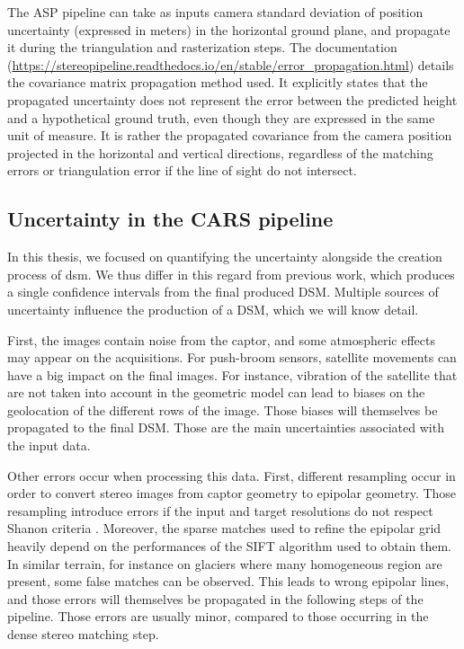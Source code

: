The ASP pipeline can take as inputs camera standard deviation of position uncertainty (expressed in meters) in the horizontal ground plane, and propagate it during the triangulation and rasterization steps. The documentation (\url{https://stereopipeline.readthedocs.io/en/stable/error_propagation.html}) details the covariance matrix propagation method used. It explicitly states that the propagated uncertainty does not represent the error between the predicted height and a hypothetical ground truth, even though they are expressed in the same unit of measure. It is rather the propagated covariance from the camera position projected in the horizontal and vertical directions, regardless of the matching errors or triangulation error if the line of sight do not intersect.

\subsection{Uncertainty in the CARS pipeline}
In this thesis, we focused on quantifying the uncertainty alongside the creation process of \acrshort{dsm}. We thus differ in this regard from previous work, which produces a single confidence intervals from the final produced DSM. Multiple sources of uncertainty influence the production of a DSM, which we will know detail.

First, the images contain noise from the captor, and some atmospheric effects may appear on the acquisitions. For push-broom sensors, satellite movements can have a big impact on the final images. For instance, vibration of the satellite that are not taken into account in the geometric model can lead to biases on the geolocation of the different rows of the image. Those biases will themselves be propagated to the final DSM. Those are the main uncertainties associated with the input data.

Other errors occur when processing this data. First, different resampling occur in order to convert stereo images from captor geometry to epipolar geometry. Those resampling introduce errors if the input and target resolutions do not respect Shanon criteria \cite{delon_small_2007} . Moreover, the sparse matches used to refine the epipolar grid heavily depend on the performances of the SIFT algorithm used to obtain them. In similar terrain, for instance on glaciers where many homogeneous region are present, some false matches can be observed. This leads to wrong epipolar lines, and those errors will themselves be propagated in the following steps of the pipeline. Those errors are usually minor, compared to those occurring in the dense stereo matching step.

